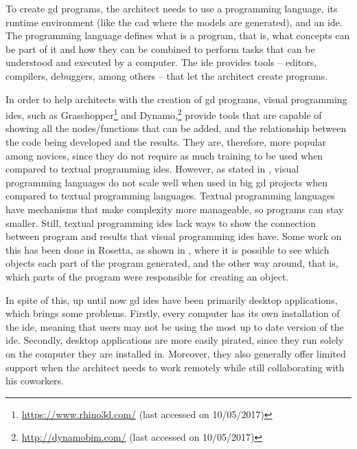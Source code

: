 To create \gls{gd} programs, the architect needs to use a programming language, its runtime environment (like the \gls{cad} where the models are generated), and an \gls{ide}.
The programming language defines what is a program, that is, what concepts can be part of it and how they can be combined to perform tasks that can be understood and executed by a computer.
The \gls{ide} provides tools -- editors, compilers, debuggers, among others -- that let the architect create programs.

In order to help architects with the creation of \gls{gd} programs, visual programming \glspl{ide}, such as Grasshopper\footnote{\url{https://www.rhino3d.com/} (last accessed on 10/05/2017)} and Dynamo,\footnote{\url{http://dynamobim.com/} (last accessed on 10/05/2017)} provide tools that are capable of showing all the nodes/functions that can be added, and the relationship between the code being developed and the results.
They are, therefore, more popular among novices, since they do not require as much training to be used when compared to textual programming \glspl{ide}.
However, as stated in \cite{leitao2012programming}, visual programming languages do not scale well when used in big \gls{gd} projects when compared to textual programming languages.
Textual programming languages have mechanisms that make complexity more manageable, so programs can stay smaller.
Still, textual programming \glspl{ide} lack ways to show the connection between program and results that visual programming \glspl{ide} have.
Some work on this has been done in Rosetta, as shown in \cite{Leitao2014illustrated}, where it is possible to see which objects each part of the program generated, and the other way around, that is, which parts of the program were responsible for creating an object.

In spite of this, up until now \gls{gd} \glspl{ide} have been primarily desktop applications, which brings some problems.
Firstly, every computer has its own installation of the \gls{ide}, meaning that users may not be using the most up to date version of the \gls{ide}.
Secondly, desktop applications are more easily pirated, since they run solely on the computer they are installed in.
Moreover, they also generally offer limited support when the architect needs to work remotely while still collaborating with his coworkers.


